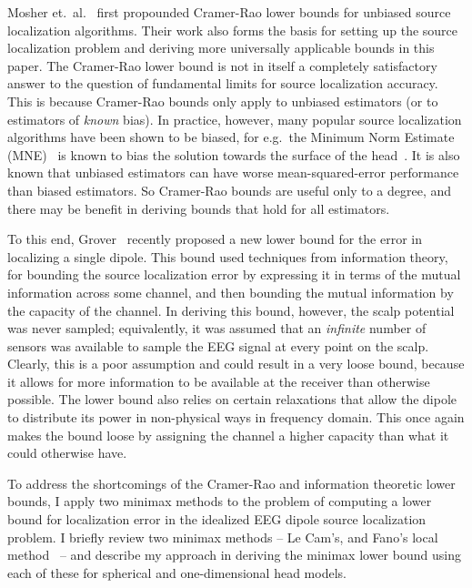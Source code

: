 \documentclass[conference]{IEEEtran}
\begin{document}
Mosher et.\ al.~\cite{Mosher1993Error} first propounded Cramer-Rao lower bounds
for unbiased source localization algorithms. Their work also forms the basis
for setting up the source localization problem and deriving more universally
applicable bounds in this paper. The Cramer-Rao lower bound is not in itself a
completely satisfactory answer to the question of fundamental limits for source
localization accuracy. This is because Cramer-Rao bounds only apply to unbiased
estimators (or to estimators of \emph{known} bias). In practice, however, many
popular source localization algorithms have been shown to be biased, for e.g.\
the Minimum Norm Estimate (MNE)~\cite{Hamalainen1994Interpreting} is known to
bias the solution towards the surface of the head~\cite{Lin2006Assessing}. It
is also known that unbiased estimators can have worse mean-squared-error
performance than biased estimators. So Cramer-Rao bounds are useful only to a
degree, and there may be benefit in deriving bounds that hold for all
estimators.

To this end, Grover~\cite{Grover2016Fundamental} recently proposed a new lower
bound for the error in localizing a single dipole. This bound used techniques
from information theory, for bounding the source localization error by
expressing it in terms of the mutual information across some channel, and then
bounding the mutual information by the capacity of the channel. In deriving
this bound, however, the scalp potential was never sampled; equivalently, it
was assumed that an \emph{infinite} number of sensors was available to sample
the EEG signal at every point on the scalp. Clearly, this is a poor assumption
and could result in a very loose bound, because it allows for more information
to be available at the receiver than otherwise possible. The lower bound also
relies on certain relaxations that allow the dipole to distribute its power in
non-physical ways in frequency domain. This once again makes the bound loose by
assigning the channel a higher capacity than what it could otherwise have.

To address the shortcomings of the Cramer-Rao and information theoretic lower
bounds, I apply two minimax methods to the problem of computing a lower bound
for localization error in the idealized EEG dipole source localization problem.
I briefly review two minimax methods -- Le Cam's, and Fano's local
method~\cite{Duchi2015Information} -- and describe my approach in deriving the
minimax lower bound using each of these for spherical and one-dimensional head
models.
\end{document}

